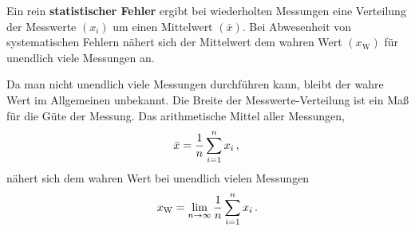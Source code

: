 \begin{rememberbox}[]{}
    Ein rein \textbf{statistischer Fehler} ergibt bei wiederholten Messungen eine Verteilung der Messwerte $(x_i)$ um einen Mittelwert $(\bar{x})$.
    Bei Abwesenheit von systematischen Fehlern nähert sich der Mittelwert dem wahren Wert $(x_{\mathrm{W}})$ für unendlich viele Messungen an. 

\end{rememberbox}
Da man nicht unendlich viele Messungen durchführen kann, bleibt der wahre Wert im Allgemeinen unbekannt. Die Breite der Messwerte-Verteilung ist ein Maß für die Güte der Messung. Das arithmetische Mittel aller Messungen, 
\begin{equation}
    \bar{x} = \frac{1}{n} \sum_{i=1}^{n} x_i \,{,}\,
\end{equation}
nähert sich dem wahren Wert bei unendlich vielen Messungen 
\begin{equation}
    x_\mathrm{W} = \lim_{n\rightarrow \infty} \frac{1}{n} \sum_{i=1}^n x_i \,.
\end{equation}
